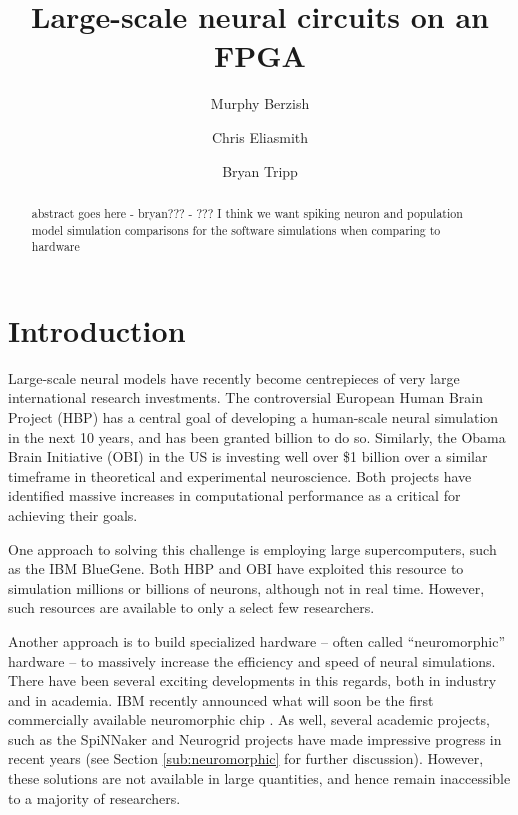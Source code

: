 \documentclass[english]{article}
\begin{document}
\lstset{basicstyle=\footnotesize}

\title{Large-scale neural circuits on an FPGA}

\author[1]{Murphy Berzish}
\author[1,2,3]{Chris Eliasmith}
\author[1,2]{Bryan Tripp}
\maketitle

\begin{abstract}
abstract goes here - bryan???
- ??? I think we want spiking neuron and population model simulation comparisons for the software simulations when comparing to hardware
\end{abstract}

\section{Introduction}

Large-scale neural models have recently become centrepieces of very large international research investments. The controversial European Human Brain Project (HBP) has a central goal of developing a human-scale neural simulation in the next 10 years, and has been granted  billion to do so.  Similarly, the Obama Brain Initiative (OBI) in the US is investing well over \$1 billion over a similar timeframe in theoretical and experimental neuroscience. Both projects have identified massive increases in computational performance as a critical for achieving their goals.

One approach to solving this challenge is employing large supercomputers, such as the IBM BlueGene.  Both HBP and OBI have exploited this resource to simulation millions or billions of neurons, although not in real time.  However, such resources are available to only a select few researchers.

Another approach is to build specialized hardware -- often called ``neuromorphic'' hardware -- to massively increase the efficiency and speed of neural simulations.  There have been several exciting developments in this regards, both in industry and in academia.  IBM recently announced what will soon be the first commercially available neuromorphic chip \cite{Merolla2014}. As well, several academic projects, such as the SpiNNaker \cite{Khan2008} and Neurogrid \cite{Choudhary2012} projects have made impressive progress in recent years (see Section \ref{sub:neuromorphic} for further discussion).  However, these solutions are not available in large quantities, and hence remain inaccessible to a majority of researchers.
\end{document}
